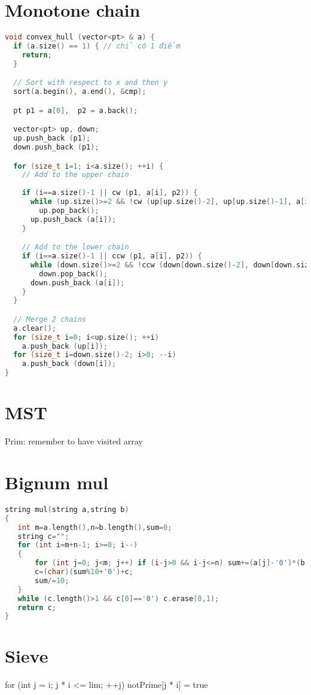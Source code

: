 \documentclass[A4 paper, 12pt]{article}
\begin{document}
	\section{Monotone chain}
	\begin{lstlisting}[language=C++]
void convex_hull (vector<pt> & a) {
  if (a.size() == 1) { // chỉ có 1 điểm
    return;
  }

  // Sort with respect to x and then y
  sort(a.begin(), a.end(), &cmp);

  pt p1 = a[0],  p2 = a.back();

  vector<pt> up, down; 
  up.push_back (p1);
  down.push_back (p1);

  for (size_t i=1; i<a.size(); ++i) { 
    // Add to the upper chain
    
    if (i==a.size()-1 || cw (p1, a[i], p2)) {
      while (up.size()>=2 && !cw (up[up.size()-2], up[up.size()-1], a[i]))
        up.pop_back();
      up.push_back (a[i]);
    }

    // Add to the lower chain
    if (i==a.size()-1 || ccw (p1, a[i], p2)) {
      while (down.size()>=2 && !ccw (down[down.size()-2], down[down.size()-1], a[i]))
        down.pop_back();
      down.push_back (a[i]);
    }
  }

  // Merge 2 chains
  a.clear();
  for (size_t i=0; i<up.size(); ++i)
    a.push_back (up[i]);
  for (size_t i=down.size()-2; i>0; --i)
    a.push_back (down[i]);
}
\end{lstlisting}
	\section{MST}
	Prim: remember to have visited array
	\section{Bignum mul}
	\begin{lstlisting}[language=C++]
string mul(string a,string b)
{
   int m=a.length(),n=b.length(),sum=0;
   string c="";
   for (int i=m+n-1; i>=0; i--)
   {
       for (int j=0; j<m; j++) if (i-j>0 && i-j<=n) sum+=(a[j]-'0')*(b[i-j-1]-'0');
       c=(char)(sum%10+'0')+c;
       sum/=10;
   }
   while (c.length()>1 && c[0]=='0') c.erase(0,1);
   return c;
}
\end{lstlisting}
	\section{Sieve}
	for (int j = i; j * i <= lim; ++j) notPrime[j * i] = true
\end{document}
